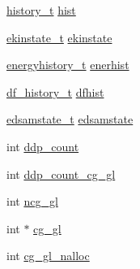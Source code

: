 \begin{DoxyCompactItemize}
\item 
\hyperlink{structhistory__t}{history\-\_\-t} \hyperlink{structt__state_a4c43374314dd057801de6bae2c236e60}{hist}
\item 
\hyperlink{structekinstate__t}{ekinstate\-\_\-t} \hyperlink{structt__state_afed0c89372aa35ca97cbc7e8498dcfee}{ekinstate}
\item 
\hyperlink{structenergyhistory__t}{energyhistory\-\_\-t} \hyperlink{structt__state_a8b6950048f8658a355b54b353d6f1a97}{enerhist}
\item 
\hyperlink{structdf__history__t}{df\-\_\-history\-\_\-t} \hyperlink{structt__state_acfb8cdee6769f833b4cb1989b110662b}{dfhist}
\item 
\hyperlink{structedsamstate__t}{edsamstate\-\_\-t} \hyperlink{structt__state_a495edf7392941d3e43fcec226e120a9a}{edsamstate}
\item 
int \hyperlink{structt__state_a16d8fbbde860871a552cd45c1d97aece}{ddp\-\_\-count}
\item 
int \hyperlink{structt__state_af356c56c20ca98911e9dbe927bacd488}{ddp\-\_\-count\-\_\-cg\-\_\-gl}
\item 
int \hyperlink{structt__state_af5a2cf5cec78485b4ca0b9284a583e85}{ncg\-\_\-gl}
\item 
int $\ast$ \hyperlink{structt__state_a9f97055c76fc0672b97632905364cc38}{cg\-\_\-gl}
\item 
int \hyperlink{structt__state_a4ba1824fb062122a7cfbd142c7e01a7d}{cg\-\_\-gl\-\_\-nalloc}
\end{DoxyCompactItemize}


